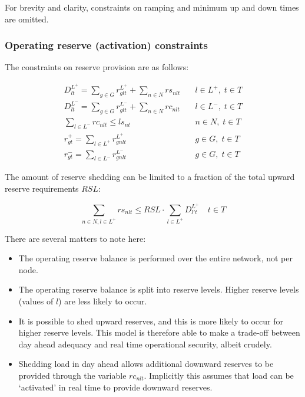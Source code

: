 \documentclass[number,times]{elsarticle}
\begin{document}
For brevity and clarity, constraints on ramping and minimum up and down times are omitted.

\subsubsection{Operating reserve (activation) constraints}

The constraints on reserve provision are as follows:

\begin{align}
    D^{L^+}_{lt} = \sum_{g \in G} r^{L^+}_{glt} + \sum_{n \in N} rs_{nlt} & \quad l \in L^+, \; t \in T \\
    D^{L^-}_{lt} = \sum_{g \in G} r^{L^-}_{glt} + \sum_{n \in N} rc_{nlt} & \quad l \in L^-, \; t \in T \\
    \sum_{l \in L^-} rc_{nlt} \leq ls_{nt}                                & \quad n \in N, \; t \in T   \\
    r^{+}_{gt} = \sum_{l \in L^+} r^{L^+}_{gnlt}                          & \quad g \in G, \; t \in T   \\
    r^{-}_{gt} = \sum_{l \in L^-} r^{L^-}_{gnlt}                          & \quad g \in G, \; t \in T
\end{align}

The amount of reserve shedding can be limited to a fraction of the total upward reserve requirements $RSL$:

\begin{equation}
    \sum_{n \in N, l \in L^+} rs_{nlt} \leq RSL \cdot \sum_{l \in L^+} D^{L^+}_{l't} \quad t \in T
\end{equation}

There are several matters to note here:

\begin{itemize}
    \item The operating reserve balance is performed over the entire network, not per node.
    \item The operating reserve balance is split into reserve levels. Higher reserve levels (values of $l$) are less likely to occur.
    \item It is possible to shed upward reserves, and this is more likely to occur for higher reserve levels. This model is therefore able to make a trade-off between day ahead adequacy and real time operational security, albeit crudely.
    \item Shedding load in day ahead allows additional downward reserves to be provided through the variable $rc_{nlt}$. Implicitly this assumes that load can be `activated' in real time to provide downward reserves.
\end{itemize}
\end{document}

